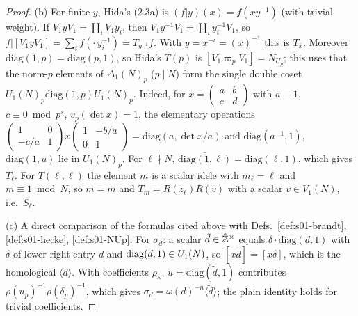 \begin{proof}
(b) For finite $y$, Hida's (2.3a) is $(f|y)(x)=f(xy^{-1})$ (with trivial weight). If $V_1yV_1=\coprod_iV_1y_i$, then $V_1y^{-1}V_1=\coprod_iy_i^{-1}V_1$, so
$f|[V_1yV_1]=\sum_if(\cdot\,y_i^{-1})=T_{y^{-1}}f$. With $y=x^{-\iota}=(\bar x)^{-1}$ this is $T_{\bar x}$. Moreover $\overline{\mathrm{diag}(1,p)}=\mathrm{diag}(p,1)$, so Hida's $T(p)$ is
$[V_1\varpi_pV_1]=N_{U_p}$; this uses that the norm-$p$ elements of $\Delta_1(N)_p$ ($p\mid N$) form the single double coset
$U_1(N)_p\mathrm{diag}(1,p)U_1(N)_p$. Indeed, for $x=\left(\begin{smallmatrix}a&b\\c&d\end{smallmatrix}\right)$ with $a\equiv1$, $c\equiv0\bmod p^s$, $v_p(\det x)=1$, the
elementary operations $\left(\begin{smallmatrix}1&0\\-c/a&1\end{smallmatrix}\right)x\left(\begin{smallmatrix}1&-b/a\\0&1\end{smallmatrix}\right)=\mathrm{diag}(a,\det x/a)$ and
$\mathrm{diag}(a^{-1},1)$, $\mathrm{diag}(1,u)$ lie in $U_1(N)_p$. For $\ell\nmid N$, $\overline{\mathrm{diag}(1,\ell)}=\mathrm{diag}(\ell,1)$, which gives $T_\ell$. For $T(\ell,\ell)$
the element $m$ is a scalar idele with $m_\ell=\ell$ and $m\equiv1\bmod N$, so $\bar m=m$ and $T_m=R(z_\ell)R(v)$ with a scalar $v\in V_1(N)$, i.e.\ $S_\ell$.

(c) A direct comparison of the formulas cited above with Defs.~\ref{def:s01-brandt}, \ref{def:s01-hecke}, \ref{def:s01-NUp}. For $\sigma_d$: a scalar
$\tilde d\in\hat{\mathbb{Z}}^\times$ equals $\delta\cdot\mathrm{diag}(d,1)$ with $\delta$ of lower right entry $d$ and $\mathrm{diag}(d,1)\in U_1(N)$, so $[x\tilde d]=[x\delta]$, which is the
homological $\langle d\rangle$. With coefficients $\rho_\kappa$, $u=\mathrm{diag}(\tilde d,1)$ contributes $\rho(u_p)^{-1}\rho(\delta_p)^{-1}$, which gives $\sigma_d=\omega(d)^{-n}\langle\tilde d\rangle$; the plain identity holds for trivial coefficients.


\end{proof}
